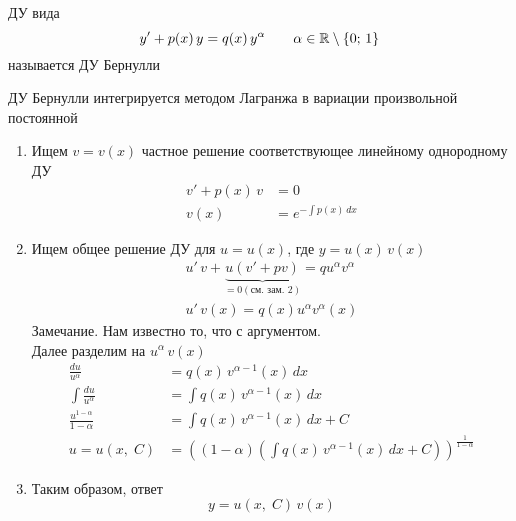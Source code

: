 \begin{Def}
    ДУ вида 
    \[
        y'+p(x)\,y=q(x)\,y^\alpha \qquad \alpha \in \mathbb{R} \setminus \{0;\,1\}
    \]
    называется ДУ Бернулли
\end{Def}

\begin{Note}
    ДУ Бернулли интегрируется методом Лагранжа в вариации произвольной постоянной
    \begin{enumerate}
        \item Ищем $v = v(x)$ частное решение соответствующее линейному однородному ДУ
        \begin{align*}
            v'+p(x)\,v &=0\\
            v(x) &=e^{-\int p(x)\,dx}
        \end{align*}
        
        \item Ищем общее решение ДУ для $u =u (x)$, где $y=u(x)\,v(x)$
        \begin{gather*}
            u'\,v+\underbrace{u(v'+pv)}_{=0 (\text{см. зам. 2})}=qu^{\alpha}v^{\alpha}\\
            u'\,v(x)=q(x)u^{\alpha}v^{\alpha}(x)
        \end{gather*}
        Замечание. Нам известно то, что с аргументом.\\
        Далее разделим на $u^{\alpha}\,v(x)$
        \begin{align*}
            \frac{du}{u^\alpha}&=q(x) \, v^{\alpha-1}(x)\,dx\\
            \int \frac{du}{u^\alpha}&=\int q(x)\, v^{\alpha-1}(x)\, dx\\
            \frac{u^{1-\alpha}}{1-\alpha} &=\int q(x)\,v^{\alpha-1}(x)\,dx + C\\
            u = u(x,\;C) &= \left((1-\alpha)\left(\int q(x)\, v^{\alpha-1}(x)\,dx+C\right)\right)^{\frac{1}{1-\alpha}}
        \end{align*}
        \item Таким образом, ответ
        \[
            y=u(x,\;C)\,v(x)
        \]
    \end{enumerate}
\end{Note}

